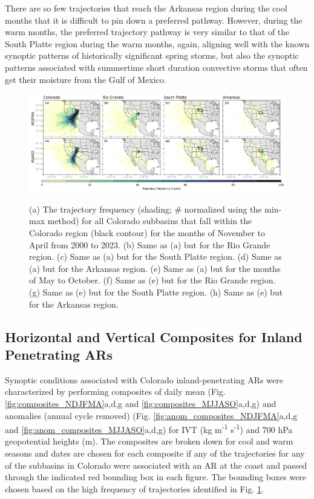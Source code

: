 \documentclass[draft]{agujournal2019}
\begin{document}
There are so few trajectories that reach the Arkansas region during the cool months that it is difficult to pin down a preferred pathway. However, during the warm months, the preferred trajectory pathway is very similar to that of the South Platte region during the warm months, again, aligning well with the known synoptic patterns of historically significant spring storms, but also the synoptic patterns associated with summertime short duration convective storms that often get their moisture from the Gulf of Mexico. 


\begin{figure}
\noindent\includegraphics[width=\textwidth]{fig6.png}
\label{fig:heatmaps}
\caption{(a) The trajectory frequency (shading; \# normalized using the min-max method) for all Colorado subbasins that fall within the Colorado region (black contour) for the months of November to April from 2000 to 2023. (b) Same as (a) but for the Rio Grande region. (c) Same as (a) but for the South Platte region. (d) Same as (a) but for the Arkansas region. (e) Same as (a) but for the months of May to October. (f) Same as (e) but for the Rio Grande region. (g) Same as (e) but for the South Platte region. (h) Same as (e) but for the Arkansas region.}
\end{figure}

\subsection{Horizontal and Vertical Composites for Inland Penetrating ARs}
\label{sec:results:composite_analysis}

Synoptic conditions associated with Colorado inland-penetrating ARs were characterized by performing composites of daily mean (Fig. \ref{fig:composites_NDJFMA}a,d,g and \ref{fig:composites_MJJASO}a,d,g) and anomalies (annual cycle removed) (Fig. \ref{fig:anom_composites_NDJFMA}a,d,g and \ref{fig:anom_composites_MJJASO}a,d,g) for IVT (kg m\textsuperscript{-1} s\textsuperscript{-1}) and 700 hPa geopotential heights (m). The composites are broken down for cool and warm seasons and dates are chosen for each composite if any of the trajectories for any of the subbasins in Colorado were associated with an AR at the coast and passed through the indicated red bounding box in each figure. The bounding boxes were chosen based on the high frequency of trajectories identified in Fig. \ref{fig:heatmaps}. 
\end{document}
